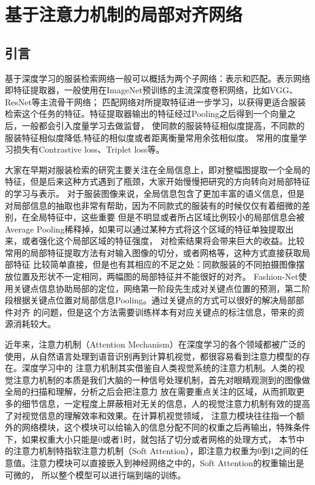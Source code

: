 \chapter{基于注意力机制的局部对齐网络}

\section{引言}
基于深度学习的服装检索网络一般可以概括为两个子网络：表示和匹配。表示网络即特征提取器，一般使用在ImageNet预训练的主流深度卷积网络，比如VGG、ResNet等主流骨干网络；
匹配网络对所提取特征进一步学习，以获得更适合服装检索这个任务的特征。特征提取器输出的特征经过Pooling之后得到一个向量之后，一般都会引入度量学习去做监督，
使同款的服装特征相似度提高，不同款的服装特征相似度降低,特征的相似度或者距离衡量常用余弦相似度。
常用的度量学习损失有Contrastive loss\cite{hadsell2006dimensionality}、Triplet loss\cite{schroff2015facenet}等。

大家在早期对服装检索的研究主要关注在全局信息上，即对整幅图提取一个全局的特征，但是后来这种方式遇到了瓶颈，大家开始慢慢把研究的方向转向对局部特征的学习与表示。
对于服装图像来说，全局信息包含了更加丰富的语义信息，但是对局部信息的抽取也非常有帮助，因为不同款式的服装有的时候仅仅有着细微的差别，在全局特征中，这些重要
但是不明显或者所占区域比例较小的局部信息会被Average Pooling稀释掉，如果可以通过某种方式将这个区域的特征单独提取出来，或者强化这个局部区域的特征强度，
对检索结果将会带来巨大的收益。比较常用的局部特征提取方法有对输入图像的切分\cite{varior2016siamese}，或者网格\cite{li2014deepreid}等，这种方式直接获取局部特征
比较简单直接，但是也有其相应的不足之处：同款服装的不同拍摄图像摆放位置及形状不一定相同，两幅图的局部特征并不能很好的对齐。
Fashion-Net使用关键点信息协助局部的定位，网络第一阶段先生成对关键点位置的预测，第二阶段根据关键点位置对局部信息Pooling。通过关键点的方式可以很好的解决局部部件对齐
的问题，但是这个方法需要训练样本有对应关键点的标注信息，带来的资源消耗较大。

近年来，注意力机制（Attention Mechanism）在深度学习的各个领域都被广泛的使用，从自然语言处理到语音识别再到计算机视觉，都很容易看到注意力模型的存在。深度学习中的
注意力机制其实借鉴自人类视觉系统的注意力机制。人类的视觉注意力机制的本质是我们大脑的一种信号处理机制，首先对眼睛观测到的图像做全局的扫描和理解，分析之后会把注意力
放在需要重点关注的区域，从而抓取更多的细节信息，一定程度上屏蔽相对无关的信息，人的视觉注意力机制有效的提高了对视觉信息的理解效率和效果。在计算机视觉领域，
注意力模块往往指一个额外的网络模块，这个模块可以给输入的信息分配不同的权重之后再输出，特殊条件下，如果权重大小只能是0或者1时，就包括了切分或者网格的处理方式，
本节中的注意力机制特指软注意力机制（Soft Attention），即注意力权重为0到1之间的任意值。注意力模块可以直接嵌入到神经网络之中的，Soft Attention的权重输出是可微的，
所以整个模型可以进行端到端的训练。

